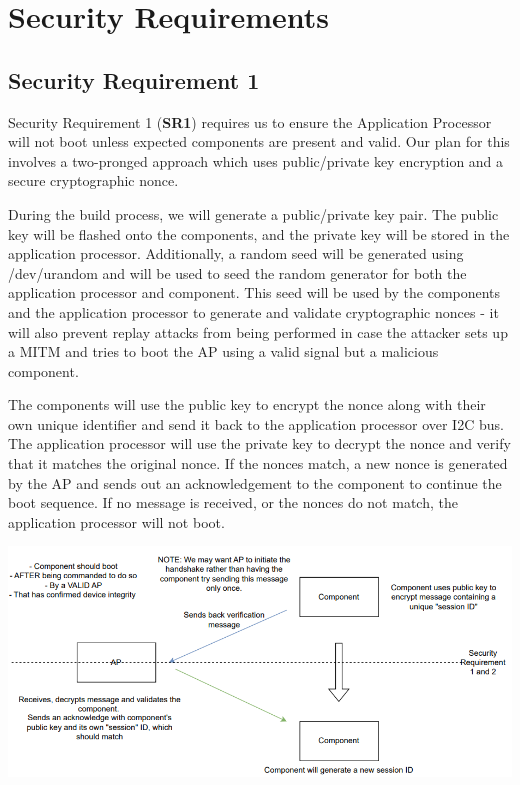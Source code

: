 \documentclass{prace}
\begin{document}
\section{Security Requirements}

\subsection{Security Requirement 1}
Security Requirement 1 (\textbf{SR1}) requires us to ensure the Application Processor will not boot unless
expected components are present and valid. Our plan for this involves a two-pronged approach
which uses public/private key encryption and a secure cryptographic nonce.

During the build process, we will generate a public/private key pair. The public key will be
flashed onto the components, and the private key will be stored in the application processor.
Additionally, a random seed will be generated using /dev/urandom and will be used to seed the
random generator for both the application processor and component. This seed will be used by the components and the application processor to generate
and validate cryptographic nonces - it will also prevent replay attacks from being performed in case the attacker sets up a MITM and tries to boot the AP using a valid signal but a malicious component.

The components will use the public key to encrypt the nonce along with their own
unique identifier and send it back to the application processor over I2C bus. The application
processor will use the private key to decrypt the nonce and verify that it matches the original
nonce. If the nonces match, a new nonce is generated by the AP and sends out an acknowledgement to the component to continue the boot sequence. If no message is received, or the nonces do not match, the application
processor will not boot.

\includegraphics[scale=0.85]{./diagramSR12.png}
\end{document}
